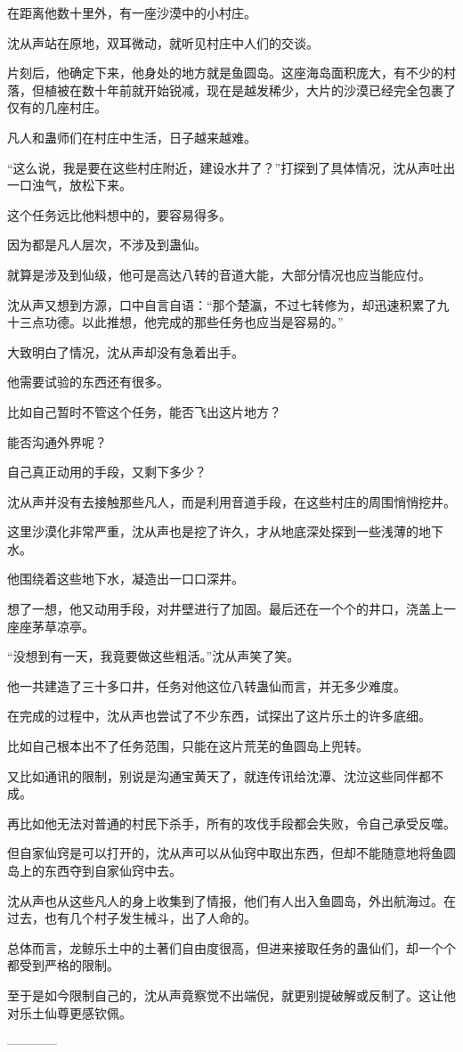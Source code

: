 \begin{this_body}
在距离他数十里外，有一座沙漠中的小村庄。

沈从声站在原地，双耳微动，就听见村庄中人们的交谈。

片刻后，他确定下来，他身处的地方就是鱼圆岛。这座海岛面积庞大，有不少的村落，但植被在数十年前就开始锐减，现在是越发稀少，大片的沙漠已经完全包裹了仅有的几座村庄。

凡人和蛊师们在村庄中生活，日子越来越难。

“这么说，我是要在这些村庄附近，建设水井了？”打探到了具体情况，沈从声吐出一口浊气，放松下来。

这个任务远比他料想中的，要容易得多。

因为都是凡人层次，不涉及到蛊仙。

就算是涉及到仙级，他可是高达八转的音道大能，大部分情况也应当能应付。

沈从声又想到方源，口中自言自语：“那个楚瀛，不过七转修为，却迅速积累了九十三点功德。以此推想，他完成的那些任务也应当是容易的。”

大致明白了情况，沈从声却没有急着出手。

他需要试验的东西还有很多。

比如自己暂时不管这个任务，能否飞出这片地方？

能否沟通外界呢？

自己真正动用的手段，又剩下多少？

沈从声并没有去接触那些凡人，而是利用音道手段，在这些村庄的周围悄悄挖井。

这里沙漠化非常严重，沈从声也是挖了许久，才从地底深处探到一些浅薄的地下水。

他围绕着这些地下水，凝造出一口口深井。

想了一想，他又动用手段，对井壁进行了加固。最后还在一个个的井口，浇盖上一座座茅草凉亭。

“没想到有一天，我竟要做这些粗活。”沈从声笑了笑。

他一共建造了三十多口井，任务对他这位八转蛊仙而言，并无多少难度。

在完成的过程中，沈从声也尝试了不少东西，试探出了这片乐土的许多底细。

比如自己根本出不了任务范围，只能在这片荒芜的鱼圆岛上兜转。

又比如通讯的限制，别说是沟通宝黄天了，就连传讯给沈潭、沈泣这些同伴都不成。

再比如他无法对普通的村民下杀手，所有的攻伐手段都会失败，令自己承受反噬。

但自家仙窍是可以打开的，沈从声可以从仙窍中取出东西，但却不能随意地将鱼圆岛上的东西夺到自家仙窍中去。

沈从声也从这些凡人的身上收集到了情报，他们有人出入鱼圆岛，外出航海过。在过去，也有几个村子发生械斗，出了人命的。

总体而言，龙鲸乐土中的土著们自由度很高，但进来接取任务的蛊仙们，却一个个都受到严格的限制。

至于是如今限制自己的，沈从声竟察觉不出端倪，就更别提破解或反制了。这让他对乐土仙尊更感钦佩。

------------

\end{this_body}

